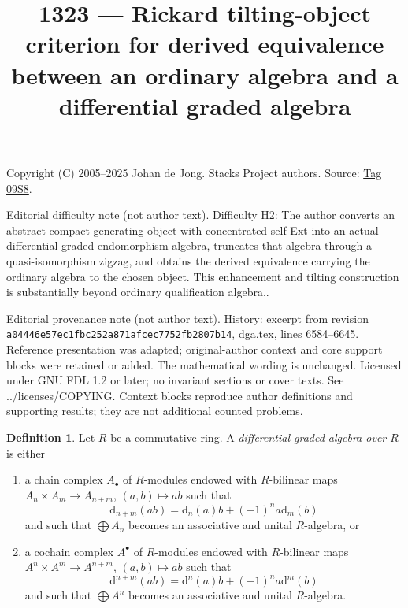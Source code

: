 \documentclass{amsart}
\theoremstyle{plain}
\theoremstyle{definition}
\newtheorem{definition}[subsection]{Definition}
\theoremstyle{remark}
\numberwithin{equation}{subsection}
\begin{document}
\title[Stacks Project, Tag 09S8]{1323 --- Rickard tilting-object criterion for derived equivalence between an ordinary algebra and a differential graded algebra}
\maketitle
\noindent Copyright (C) 2005--2025 Johan de Jong. Stacks Project authors. Source: \href{https://stacks.math.columbia.edu/tag/09S8}{Tag 09S8}.

\noindent Editorial difficulty note (not author text). Difficulty H2: The author converts an abstract compact generating object with concentrated self-Ext into an actual differential graded endomorphism algebra, truncates that algebra through a quasi-isomorphism zigzag, and obtains the derived equivalence carrying the ordinary algebra to the chosen object. This enhancement and tilting construction is substantially beyond ordinary qualification algebra..

\noindent Editorial provenance note (not author text). History: excerpt from revision \texttt{a0444\allowbreak 6e57e\allowbreak c1fbc\allowbreak 252a8\allowbreak 71afc\allowbreak ec775\allowbreak 2fb28\allowbreak 07b14}, dga.tex, lines 6584--6645. Reference presentation was adapted; original-author context and core support blocks were retained or added. The mathematical wording is unchanged. Licensed under GNU FDL 1.2 or later; no invariant sections or cover texts. See ../licenses/COPYING. Context blocks reproduce author definitions and supporting results; they are not additional counted problems.

\begin{definition}
\label{definition-dga}
Let $R$ be a commutative ring. A {\it differential graded algebra over $R$}
is either
\begin{enumerate}
\item a chain complex $A_\bullet$ of $R$-modules endowed with
$R$-bilinear maps $A_n \times A_m \to A_{n + m}$,
$(a, b) \mapsto ab$ such that
$$
\text{d}_{n + m}(ab) = \text{d}_n(a)b + (-1)^n a\text{d}_m(b)
$$
and such that $\bigoplus A_n$ becomes an associative and unital
$R$-algebra, or
\item a cochain complex $A^\bullet$ of $R$-modules endowed with
$R$-bilinear maps $A^n \times A^m \to A^{n + m}$, $(a, b) \mapsto ab$
such that
$$
\text{d}^{n + m}(ab) = \text{d}^n(a)b + (-1)^n a\text{d}^m(b)
$$
and such that $\bigoplus A^n$ becomes an associative and unital $R$-algebra.
\end{enumerate}
\end{definition}
\end{document}
